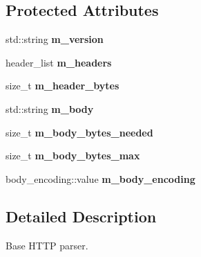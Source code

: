 \subsection*{Protected Attributes}
\begin{DoxyCompactItemize}
\item 
std\+::string {\bfseries m\+\_\+version}\hypertarget{classwebsocketpp_1_1http_1_1parser_1_1parser_a3e8026fc40c96ca8bfa46a533e00d6a6}{}\label{classwebsocketpp_1_1http_1_1parser_1_1parser_a3e8026fc40c96ca8bfa46a533e00d6a6}

\item 
header\+\_\+list {\bfseries m\+\_\+headers}\hypertarget{classwebsocketpp_1_1http_1_1parser_1_1parser_ae75e1e6acd17cc5a5543f818a5355a50}{}\label{classwebsocketpp_1_1http_1_1parser_1_1parser_ae75e1e6acd17cc5a5543f818a5355a50}

\item 
size\+\_\+t {\bfseries m\+\_\+header\+\_\+bytes}\hypertarget{classwebsocketpp_1_1http_1_1parser_1_1parser_ae82ee117b729da521de60401cd17f8d4}{}\label{classwebsocketpp_1_1http_1_1parser_1_1parser_ae82ee117b729da521de60401cd17f8d4}

\item 
std\+::string {\bfseries m\+\_\+body}\hypertarget{classwebsocketpp_1_1http_1_1parser_1_1parser_a2a552a4581ae26674fd6d566e5b332ee}{}\label{classwebsocketpp_1_1http_1_1parser_1_1parser_a2a552a4581ae26674fd6d566e5b332ee}

\item 
size\+\_\+t {\bfseries m\+\_\+body\+\_\+bytes\+\_\+needed}\hypertarget{classwebsocketpp_1_1http_1_1parser_1_1parser_a89e6a7583bee97f30c60dc88b4cd29dd}{}\label{classwebsocketpp_1_1http_1_1parser_1_1parser_a89e6a7583bee97f30c60dc88b4cd29dd}

\item 
size\+\_\+t {\bfseries m\+\_\+body\+\_\+bytes\+\_\+max}\hypertarget{classwebsocketpp_1_1http_1_1parser_1_1parser_a85613c9d20e308ff343449852b7e769f}{}\label{classwebsocketpp_1_1http_1_1parser_1_1parser_a85613c9d20e308ff343449852b7e769f}

\item 
body\+\_\+encoding\+::value {\bfseries m\+\_\+body\+\_\+encoding}\hypertarget{classwebsocketpp_1_1http_1_1parser_1_1parser_a286e19d30028f6dbc295ad578e8e50d3}{}\label{classwebsocketpp_1_1http_1_1parser_1_1parser_a286e19d30028f6dbc295ad578e8e50d3}

\end{DoxyCompactItemize}


\subsection{Detailed Description}
Base H\+T\+TP parser. 

